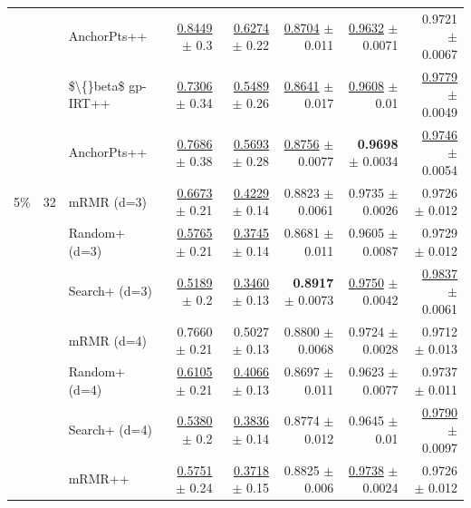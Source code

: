 \begin{longtable}{llp{}rrrrr}
 &  & AnchorPts++ & \underline{0.8449} {\scriptsize $\pm$ 0.3} & \underline{0.6274} {\scriptsize $\pm$ 0.22} & \underline{0.8704} {\scriptsize $\pm$ 0.011} & \underline{0.9632} {\scriptsize $\pm$ 0.0071} & 0.9721 {\scriptsize $\pm$ 0.0067} \\
 &  & \$\textbackslash\{\}beta\$ gp-IRT++ & \underline{0.7306} {\scriptsize $\pm$ 0.34} & \underline{0.5489} {\scriptsize $\pm$ 0.26} & \underline{0.8641} {\scriptsize $\pm$ 0.017} & \underline{0.9608} {\scriptsize $\pm$ 0.01} & \underline{0.9779} {\scriptsize $\pm$ 0.0049} \\
 &  & AnchorPts++ & \underline{0.7686} {\scriptsize $\pm$ 0.38} & \underline{0.5693} {\scriptsize $\pm$ 0.28} & \underline{0.8756} {\scriptsize $\pm$ 0.0077} & \textbf{0.9698} {\scriptsize $\pm$ 0.0034} & \underline{0.9746} {\scriptsize $\pm$ 0.0054} \\
\midrule
5\% & 32 & mRMR (d=3) & \underline{0.6673} {\scriptsize $\pm$ 0.21} & \underline{0.4229} {\scriptsize $\pm$ 0.14} & 0.8823 {\scriptsize $\pm$ 0.0061} & 0.9735 {\scriptsize $\pm$ 0.0026} & 0.9726 {\scriptsize $\pm$ 0.012} \\
 &  & Random+ (d=3) & \underline{0.5765} {\scriptsize $\pm$ 0.21} & \underline{0.3745} {\scriptsize $\pm$ 0.14} & 0.8681 {\scriptsize $\pm$ 0.011} & 0.9605 {\scriptsize $\pm$ 0.0087} & 0.9729 {\scriptsize $\pm$ 0.012} \\
 &  & Search+ (d=3) & \underline{0.5189} {\scriptsize $\pm$ 0.2} & \underline{0.3460} {\scriptsize $\pm$ 0.13} & \textbf{0.8917} {\scriptsize $\pm$ 0.0073} & \underline{0.9750} {\scriptsize $\pm$ 0.0042} & \underline{0.9837} {\scriptsize $\pm$ 0.0061} \\
 &  & mRMR (d=4) & 0.7660 {\scriptsize $\pm$ 0.21} & 0.5027 {\scriptsize $\pm$ 0.13} & 0.8800 {\scriptsize $\pm$ 0.0068} & 0.9724 {\scriptsize $\pm$ 0.0028} & 0.9712 {\scriptsize $\pm$ 0.013} \\
 &  & Random+ (d=4) & \underline{0.6105} {\scriptsize $\pm$ 0.21} & \underline{0.4066} {\scriptsize $\pm$ 0.13} & 0.8697 {\scriptsize $\pm$ 0.011} & 0.9623 {\scriptsize $\pm$ 0.0077} & 0.9737 {\scriptsize $\pm$ 0.011} \\
 &  & Search+ (d=4) & \underline{0.5380} {\scriptsize $\pm$ 0.2} & \underline{0.3836} {\scriptsize $\pm$ 0.14} & 0.8774 {\scriptsize $\pm$ 0.012} & 0.9645 {\scriptsize $\pm$ 0.01} & \underline{0.9790} {\scriptsize $\pm$ 0.0097} \\
 &  & mRMR++ & \underline{0.5751} {\scriptsize $\pm$ 0.24} & \underline{0.3718} {\scriptsize $\pm$ 0.15} & 0.8825 {\scriptsize $\pm$ 0.006} & \underline{0.9738} {\scriptsize $\pm$ 0.0024} & 0.9726 {\scriptsize $\pm$ 0.012} \\

\end{longtable}
